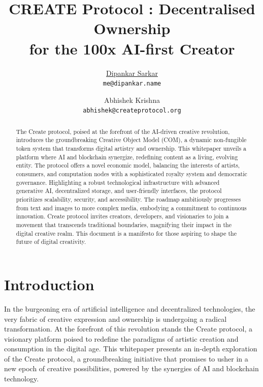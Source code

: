 \documentclass[12pt,a4paper]{article}
\title{CREATE Protocol : Decentralised Ownership \\ for the 100x AI-first Creator}
\author{\href{https://orcid.org/0000-0001-5431-6367}{\hspace{1mm}Dipankar Sarkar} \\
  \texttt{me@dipankar.name} \\
        \and
	Abhishek Krishna \\
	\texttt{abhishek@createprotocol.org} \\
 }
\begin{document}
\pagestyle{fancy}
\fancyhead{} %
\fancyfoot{} %
\fancyfoot[LE,RO]{\thepage}
\fancyfoot[LO,CE]{}
\fancyfoot[CO,RE]{}

\maketitle

\begin{abstract}
The Create protocol, poised at the forefront of the AI-driven creative revolution, introduces the groundbreaking Creative Object Model (COM), a dynamic non-fungible token system that transforms digital artistry and ownership. This whitepaper unveils a platform where AI and blockchain synergize, redefining content as a living, evolving entity. The protocol offers a novel economic model, balancing the interests of artists, consumers, and computation nodes with a sophisticated royalty system and democratic governance. Highlighting a robust technological infrastructure with advanced generative AI, decentralized storage, and user-friendly interfaces, the protocol prioritizes scalability, security, and accessibility. The roadmap ambitiously progresses from text and images to more complex media, embodying a commitment to continuous innovation. Create protocol invites creators, developers, and visionaries to join a movement that transcends traditional boundaries, magnifying their impact in the digital creative realm. This document is a manifesto for those aspiring to shape the future of digital creativity.
\end{abstract}

\pagebreak

\tableofcontents

\pagebreak

\section{Introduction}\label{sec:intro}

In the burgeoning era of artificial intelligence and decentralized technologies, the very fabric of creative expression and ownership is undergoing a radical transformation. At the forefront of this revolution stands the Create protocol, a visionary platform poised to redefine the paradigms of artistic creation and consumption in the digital age. This whitepaper presents an in-depth exploration of the Create protocol, a groundbreaking initiative that promises to usher in a new epoch of creative possibilities, powered by the synergies of AI and blockchain technology.
\end{document}
